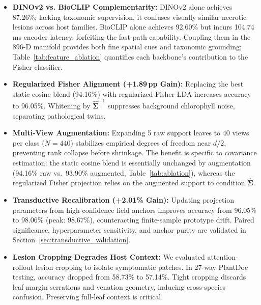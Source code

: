\documentclass[preprint,12pt]{elsarticle}
\begin{document}
\begin{itemize}
    \item \textbf{DINOv2 vs. BioCLIP Complementarity:} DINOv2 alone achieves 87.26\%; lacking taxonomic supervision, it confuses visually similar necrotic lesions across host families. BioCLIP alone achieves 92.60\% but incurs 104.74\,ms encoder latency, forfeiting the fast-path capability. Coupling them in the 896-D manifold provides both fine spatial cues and taxonomic grounding; Table~\ref{tab:feature_ablation} quantifies each backbone's contribution to the Fisher classifier.
    \item \textbf{Regularized Fisher Alignment (+1.89\,pp Gain):} Replacing the best static cosine blend (94.16\%) with regularized Fisher-LDA increases accuracy to 96.05\%. Whitening by $\hat{\mathbf{\Sigma}}^{-1}$ suppresses background chlorophyll noise, separating pathological twins.
    \item \textbf{Multi-View Augmentation:} Expanding 5 raw support leaves to 40 views per class ($N=440$) stabilizes empirical degrees of freedom near $d/2$, preventing rank collapse before shrinkage. The benefit is specific to covariance estimation: the static cosine blend is essentially unchanged by augmentation (94.16\% raw vs.\ 93.90\% augmented, Table~\ref{tab:ablation}), whereas the regularized Fisher projection relies on the augmented support to condition $\hat{\mathbf{\Sigma}}$.
    \item \textbf{Transductive Recalibration (+2.01\% Gain):} Updating projection parameters from high-confidence field anchors improves accuracy from 96.05\% to 98.06\% (peak: 98.67\%), counteracting finite-sample prototype drift. Paired significance, hyperparameter sensitivity, and anchor purity are validated in Section~\ref{sec:transductive_validation}.
    \item \textbf{Lesion Cropping Degrades Host Context:} We evaluated attention-rollout lesion cropping to isolate symptomatic patches. In 27-way PlantDoc testing, accuracy dropped from 58.73\% to 57.14\%. Tight cropping discards leaf margin serrations and venation geometry, inducing cross-species confusion. Preserving full-leaf context is critical.
\end{itemize}
\end{document}
